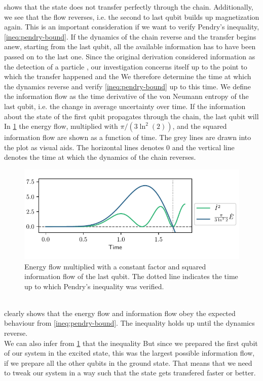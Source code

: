\documentclass{book}
\numberwithin{equation}{section} %
\begin{document}
 shows that the state does not transfer perfectly through the chain.
Additionally, we see that the flow reverses, i.e. the second to last qubit builds up magnetization again.
This is an important consideration if we want to verify Pendry's inequality, \cref{ineq:pendry-bound}.
If the dynamics of the chain reverse and the transfer begins anew, starting from the last qubit,
all the available information has to have been passed on to the last one.
Since the original derivation considered information as the detection of a particle \cite{BA_Pendry_1983}, 
our investigation concerns itself up to the point to which the transfer happened and the 
We therefore determine the time at which the dynamics reverse and verify \cref{ineq:pendry-bound} up to this time.
We define the information flow as the time derivative of the von Neumann entropy of the last qubit,
i.e. the change in average uncertainty over time.
If the information about the state of the first qubit propagates through the chain, the last qubit will 
In \cref{fig:hom_pendry} the energy flow, multiplied with $\pi/(3\ln^2(2))$, and the squared information flow are shown as a function of time.
The grey lines are drawn into the plot as visual aids. The horizontal lines denotes $0$ and the vertical line denotes the
time at which the dynamics of the chain reverses.
\begin{figure}[h!]
    \centering
    \includegraphics{alltheplots/j_const/pendry_grey_lines_fixed_legend.pdf}
    \caption{Energy flow multiplied with a constant factor and squared information flow of the last qubit. The dotted line
    indicates the time up to which Pendry's inequality \cite{BA_Pendry_1983} was verified.}
    \label{fig:hom_pendry}
\end{figure}\\
 clearly shows that the energy flow and information flow obey the expected behaviour from \cref{ineq:pendry-bound}.
The inequality holds up until the dynamics reverse.\\
We can also infer from \cref{fig:hom_pendry} that the inequality 
But since we prepared the first qubit of our system in the excited state, this was the largest possible information flow, if we prepare
all the other qubits in the ground state. That means that we need to tweak our system in a way such that the state gets transfered faster or better.
\end{document}
